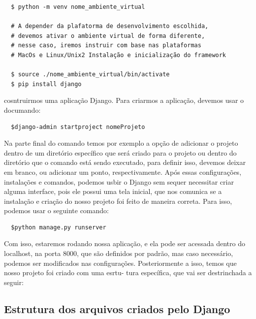 \documentclass[12pt, a4paper]{paper}
\begin{document}
\begin{verbatim}
  $ python -m venv nome_ambiente_virtual

  # A depender da plafatorma de desenvolvimento escolhida,
  # devemos ativar o ambiente virtual de forma diferente,
  # nesse caso, iremos instruir com base nas plataformas
  # MacOs e Linux/Unix2 Instalação e inicialização do framework

  $ source ./nome_ambiente_virtual/bin/activate
  $ pip install django
\end{verbatim}

cosntruirmos uma aplicação Django. Para criarmos a aplicação, devemos
usar o documando:

\begin{verbatim}
  $django-admin startproject nomeProjeto
\end{verbatim}

Na parte final do comando temos por exemplo a opção de adicionar o
projeto dentro de um diretório específico que será criado para o projeto ou
dentro do diretório que o comando está sendo executado, para definir isso,
devemos deixar em branco, ou adicionar um ponto, respectivamente. Após
essas configurações, instalações e comandos, podemos usbir o Django sem
sequer necessitar criar alguma interface, pois ele possui uma tela inicial, que
nos comunica se a instalação e criação do nosso projeto foi feito de maneira
correta. Para isso, podemos usar o seguinte comando:

\begin{verbatim}
  $python manage.py runserver
\end{verbatim}

Com isso, estaremos rodando nossa aplicação, e ela pode ser acessada
dentro do localhost, na porta 8000, que são definidos por padrão, mas caso
necessário, podemos ser modificados nas configurações.
Posteriormente a isso, temos que nosso projeto foi criado com uma esrtu-
tura específica, que vai ser destrinchada a seguir:

\subsection{Estrutura dos arquivos criados pelo Django} %
\label{sub:Estrutura dos arquivos criados pelo Django}
\end{document}
